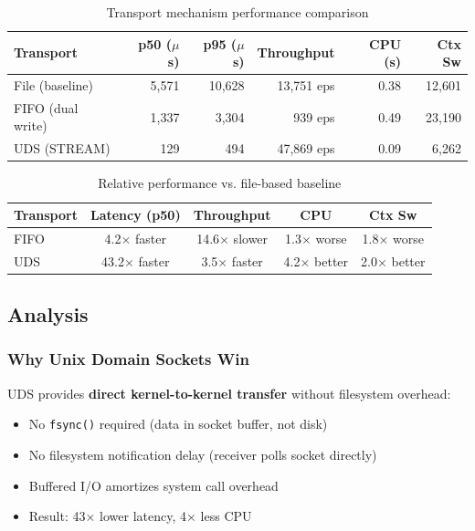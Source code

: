\documentclass[11pt]{article}
\begin{document}
\begin{table}[h]
\centering
\begin{tabular}{@{}lrrrrr@{}}
\toprule
\textbf{Transport} & \textbf{p50 ($\mu$s)} & \textbf{p95 ($\mu$s)} & \textbf{Throughput} & \textbf{CPU (s)} & \textbf{Ctx Sw} \\ \midrule
File (baseline) & 5,571 & 10,628 & 13,751 eps & 0.38 & 12,601 \\
FIFO (dual write) & 1,337 & 3,304 & 939 eps & 0.49 & 23,190 \\
UDS (STREAM) & 129 & 494 & 47,869 eps & 0.09 & 6,262 \\
\bottomrule
\end{tabular}
\caption{Transport mechanism performance comparison}
\end{table}

\begin{table}[h]
\centering
\begin{tabular}{@{}lcccc@{}}
\toprule
\textbf{Transport} & \textbf{Latency (p50)} & \textbf{Throughput} & \textbf{CPU} & \textbf{Ctx Sw} \\ \midrule
FIFO & 4.2$\times$ faster & 14.6$\times$ slower & 1.3$\times$ worse & 1.8$\times$ worse \\
UDS & 43.2$\times$ faster & 3.5$\times$ faster & 4.2$\times$ better & 2.0$\times$ better \\
\bottomrule
\end{tabular}
\caption{Relative performance vs. file-based baseline}
\end{table}

\subsection{Analysis}

\subsubsection{Why Unix Domain Sockets Win}

UDS provides \textbf{direct kernel-to-kernel transfer} without filesystem overhead:

\begin{itemize}
\item No \texttt{fsync()} required (data in socket buffer, not disk)
\item No filesystem notification delay (receiver polls socket directly)
\item Buffered I/O amortizes system call overhead
\item Result: 43$\times$ lower latency, 4$\times$ less CPU
\end{itemize}
\end{document}

